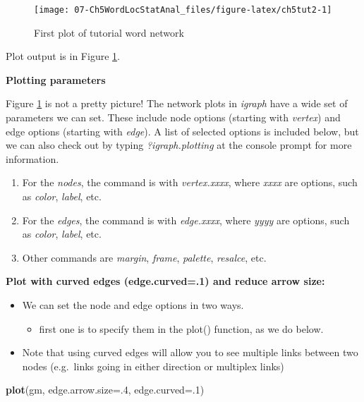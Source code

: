 \documentclass[
]{article}
\newenvironment{Shaded}{\begin{snugshade}}{\end{snugshade}}
\newcommand{\AttributeTok}[1]{\textcolor[rgb]{0.13,0.29,0.53}{#1}}
\newcommand{\DecValTok}[1]{\textcolor[rgb]{0.00,0.00,0.81}{#1}}
\newcommand{\FunctionTok}[1]{\textcolor[rgb]{0.13,0.29,0.53}{\textbf{#1}}}
\newcommand{\NormalTok}[1]{#1}
\providecommand{\tightlist}{%
  \setlength{\itemsep}{0pt}\setlength{\parskip}{0pt}}
\begin{document}
\begin{figure}

{\centering \texttt{[image: 07-Ch5WordLocStatAnal\_files/figure-latex/ch5tut2-1]} 

}

\caption{First plot of tutorial word network}\label{fig:ch5tut2}
\end{figure}

Plot output is in Figure \ref{fig:ch5tut2}.

\textbf{Plotting parameters}

Figure \ref{fig:ch5tut2} is not a pretty picture! The network plots in \emph{igraph} have a wide set of parameters we can set. These include node options (starting with \emph{vertex}) and edge options (starting with \emph{edge}). A list of selected options is included below, but we can also check out by typing \emph{?igraph.plotting} at the console prompt for more information.

\begin{enumerate}
\def\labelenumi{\arabic{enumi}.}
\tightlist
\item
  For the \emph{nodes}, the command is with \emph{vertex.xxxx}, where \emph{xxxx} are options, such as \emph{color}, \emph{label}, etc.
\item
  For the \emph{edges}, the command is with \emph{edge.xxxx}, where \emph{yyyy} are options, such as \emph{color}, \emph{label}, etc.
\item
  Other commands are \emph{margin}, \emph{frame}, \emph{palette}, \emph{resalce}, etc.
\end{enumerate}

\textbf{Plot with curved edges (edge.curved=.1) and reduce arrow size:}

\begin{itemize}
\tightlist
\item
  We can set the node and edge options in two ways.

  \begin{itemize}
  \tightlist
  \item
    first one is to specify them in the plot() function, as we do below.
  \end{itemize}
\item
  Note that using curved edges will allow you to see multiple links between two nodes (e.g.~links going in either direction or multiplex links)
\end{itemize}

\begin{Shaded}
\begin{Highlighting}[]
\FunctionTok{plot}\NormalTok{(gm, }\AttributeTok{edge.arrow.size=}\NormalTok{.}\DecValTok{4}\NormalTok{, }\AttributeTok{edge.curved=}\NormalTok{.}\DecValTok{1}\NormalTok{)}
\end{Highlighting}
\end{Shaded}
\end{document}
